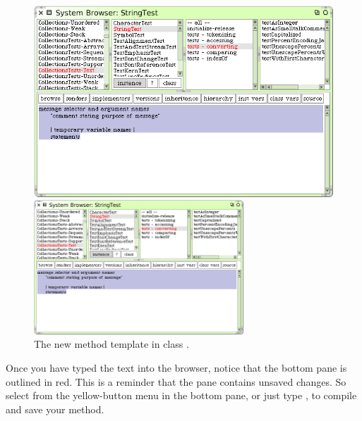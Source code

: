 \documentclass[a4paper,10pt,twoside]{book}
\begin{document}
\begin{figure}[hbt]
\ifluluelse
	{\centerline {\includegraphics[width=\textwidth]{StringTest-newMethodTemplate}}}
	{\centerline {\includegraphics[width=0.7\textwidth]{StringTest-newMethodTemplate}}}
\caption{The new method template in class .
\label{fig:newMethodTemplate}}
\end{figure}

Once you have typed the text into the browser, notice that the bottom pane is outlined in red.  This is a reminder that the pane contains unsaved changes.
So select  from the yellow-button menu in the bottom pane, or just type , to compile and save your method.
\end{document}
